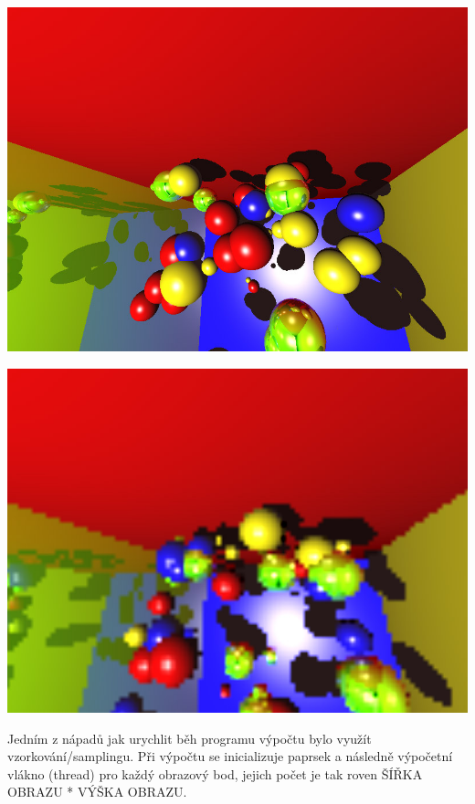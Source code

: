 \documentclass[12pt,a4paper,titlepage,final]{report}
\begin{document}
\begin{center}

	\captionsetup{type=figure}
		\includegraphics[width=14cm]{images/no-sampling-no-bvh.jpg}
	

	\captionsetup{type=figure}
		\includegraphics[width=14cm]{images/with-sampling-no-bvh.jpg}
\end{center}
	\vspace{5mm}
Jedním z nápadů jak urychlit běh programu výpočtu bylo využít vzorkování/samplingu. Při výpočtu se inicializuje paprsek a následně výpočetní vlákno (thread) pro každý obrazový bod, jejich počet je tak roven ŠÍŘKA OBRAZU * VÝŠKA OBRAZU. 
	
\end{document}
